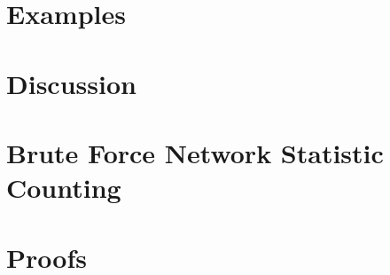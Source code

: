 \documentclass[oneside]{myumnStatThesis}
\begin{document}
\chapter{Examples} \label{S:Examples}


\chapter{Discussion}



%

%

\appendix
\chapter{Brute Force Network Statistic Counting} \label{Section:Count Triangles}


\chapter{Proofs} \label{Section:Proofs}

\end{document}

